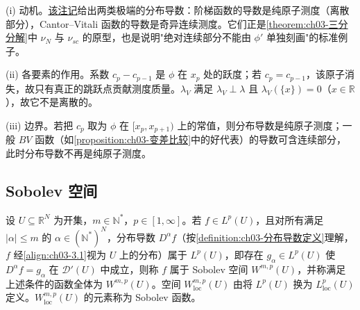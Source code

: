 \documentclass[../../main.tex]{subfiles}%
\begin{document}
\begin{remark}\label{remark:ch03-阶梯函数导数动机}
(i) 动机。\hyperref[remark:ch03-阶梯函数导数]{该注记}给出两类极端的分布导数：阶梯函数的导数是纯原子测度（离散部分），Cantor--Vitali 函数的导数是奇异连续测度。它们正是\cref{theorem:ch03-三分分解}中 $\nu_N$ 与 $\nu_{sc}$ 的原型，也是说明"绝对连续部分不能由 $\phi'$ 单独刻画"的标准例子。

(ii) 各要素的作用。系数 $c_p-c_{p-1}$ 是 $\phi$ 在 $x_p$ 处的跃度；若 $c_p=c_{p-1}$，该原子消失，故只有真正的跳跃点贡献测度质量。$\lambda_V$ 满足 $\lambda_V\perp\lambda$ 且 $\lambda_V(\{x\})=0$（$x\in\mathbb{R}$），故它不是离散的。

(iii) 边界。若把 $c_p$ 取为 $\phi$ 在 $[x_p,x_{p+1})$ 上的常值，则分布导数是纯原子测度；一般 $BV$ 函数（如\cref{proposition:ch03-变差比较}中的好代表）的导数可含连续部分，此时分布导数不再是纯原子测度。
\end{remark}

\subsection{Sobolev 空间}\label{subsection:ch03-Sobolev空间}

\begin{definition}\label{definition:ch03-Sobolev空间定义}
设 $U\subseteq\mathbb{R}^N$ 为开集，$m\in\mathbb{N}^*$，$p\in[1,\infty]$。若 $f\in L^p(U)$，且对所有满足 $|\alpha|\leqslant m$ 的 $\alpha\in(\mathbb{N}^*)^N$，分布导数 $D^\alpha f$（按\cref{definition:ch03-分布导数定义}理解，$f$ 经\eqref{align:ch03-3.1}视为 $U$ 上的分布）属于 $L^p(U)$，即存在 $g_\alpha\in L^p(U)$ 使 $D^\alpha f=g_\alpha$ 在 $\mathcal{D}'(U)$ 中成立，则称 $f$ 属于 Sobolev 空间 $W^{m,p}(U)$，并称满足上述条件的函数全体为 $W^{m,p}(U)$。空间 $W^{m,p}_{\mathrm{loc}}(U)$ 由将 $L^p(U)$ 换为 $L^p_{\mathrm{loc}}(U)$ 定义。$W^{m,p}_{\mathrm{loc}}(U)$ 的元素称为 Sobolev 函数。
\end{definition}
\end{document}
